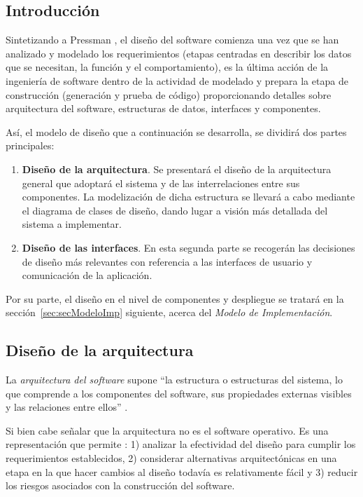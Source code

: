 \subsection{Introducción}

Sintetizando a Pressman \cite{Pre10}, el diseño del software comienza una vez que se han analizado y modelado los requerimientos (etapas centradas en describir los datos que se necesitan, la función y el comportamiento), es la última acción de la ingeniería de software dentro de la actividad de modelado y prepara la etapa de construcción (generación y prueba de código) proporcionando detalles sobre arquitectura del software, estructuras de datos, interfaces y componentes.

Así, el modelo de diseño que a continuación se desarrolla, se dividirá dos partes principales:

\begin{enumerate}
	\item \textbf{Diseño de la arquitectura}. Se presentará el diseño de la arquitectura general que adoptará el sistema y de las interrelaciones entre sus componentes. La modelización de dicha estructura se llevará a cabo mediante el diagrama de clases de diseño, dando lugar a visión más detallada del sistema a implementar.
	\item \textbf{Diseño de las interfaces}. En esta segunda parte se recogerán las decisiones de diseño más relevantes con referencia a las interfaces de usuario y comunicación de la aplicación.
\end{enumerate}

Por su parte, el diseño en el nivel de componentes y despliegue se tratará en la sección~\ref{sec:secModeloImp} siguiente, acerca del \emph{Modelo de Implementación}.

\subsection{Diseño de la arquitectura}

La \emph{arquitectura del software} supone ``la estructura o estructuras del sistema, lo que comprende a los componentes del software, sus propiedades externas visibles y las relaciones entre ellos'' \cite{Bas03}.

Si bien cabe señalar que la arquitectura no es el software operativo. Es una representación que permite \cite{Pre10}: 1) analizar la efectividad del diseño para cumplir los requerimientos establecidos, 2) considerar alternativas arquitectónicas en una etapa en la que hacer cambios al diseño todavía es relativamente fácil y 3) reducir los riesgos asociados con la construcción del software.

